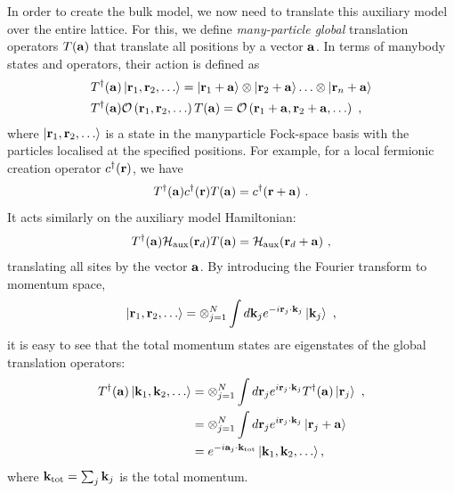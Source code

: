\documentclass[reprint,hidelinks]{revtex4-2}
\begin{document}
In order to create the bulk model, we now need to translate this auxiliary model over the entire lattice. For this, we define {\it many-particle global} translation operators \(T({\bf a})\) that translate all positions by a vector \({\bf a}\). In terms of manybody states and operators, their action is defined as 
\begin{equation}\begin{aligned}\label{translationDefinition}
	&T^\dagger({\bf a}) \ket{{\bf r}_1, {\bf r}_2,\ldots} = \ket{{\bf r}_1 + {\bf a}}\otimes\ket{{\bf r}_2 + {\bf a}}\ldots\otimes\ket{{\bf r}_n + {\bf a}}\\
	&T^\dagger({\bf a}) \mathcal{O}\left({\bf r}_1, {\bf r}_2,\ldots\right)T({\bf a}) = \mathcal{O}\left({\bf r}_1 + {\bf a}, {\bf r}_2 + {\bf a},\ldots\right)~,
\end{aligned}\end{equation}
where \(\ket{{\bf r}_1, {\bf r}_2,\ldots}\) is a state in the manyparticle Fock-space basis with the particles localised at the specified positions. For example, for a local fermionic creation operator \(c^\dagger({\bf r})\), we have 
\begin{equation}\begin{aligned}
	T^\dagger({\bf a}) c^\dagger({\bf r}) T({\bf a}) = c^\dagger({\bf r} + {\bf a})~.
\end{aligned}\end{equation}
It acts similarly on the auxiliary model Hamiltonian:
\begin{equation}\begin{aligned}
	T^\dagger({\bf a})\mathcal{H}_\text{aux}({\bf r}_d)T({\bf a}) = \mathcal{H}_\text{aux}({\bf r}_d + {\bf a})~,
\end{aligned}\end{equation}
translating all sites by the vector \({\bf a}\). By introducing the Fourier transform to momentum space,
\begin{equation}\begin{aligned}
	\ket{{\bf r}_1, {\bf r}_2,\ldots} = \otimes_{j=1}^N \int d{\bf k}_j e^{-i {\bf r}_j\cdot{\bf k}_j} \ket{{\bf k}_j}~,
\end{aligned}\end{equation}
it is easy to see that the total momentum states are eigenstates of the global translation operators:
\begin{equation}\begin{aligned}
	T^\dagger({\bf a})\ket{{\bf k}_1, {\bf k}_2,\ldots} &= \otimes_{j=1}^N \int d{\bf r}_j e^{i {\bf r}_j\cdot{\bf k}_j} T^\dagger({\bf a})\ket{{\bf r}_j}~,\\
							    &=\otimes_{j=1}^N \int d{\bf r}_j e^{i {\bf r}_j\cdot{\bf k}_j} \ket{{\bf r}_j + {\bf a}}\\
							    &=e^{-i {\bf a}_j\cdot{\bf k}_\text{tot}}\ket{{\bf k}_1, {\bf k}_2,\ldots},
\end{aligned}\end{equation}
where \({\bf k}_\text{tot} = \sum_j {\bf k}_j\) is the total momentum.
\end{document}
